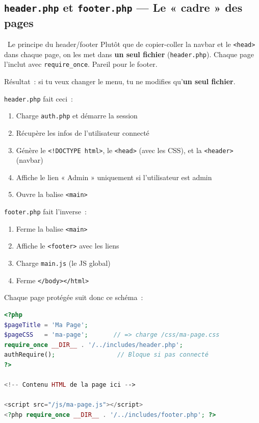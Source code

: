 \documentclass[12pt,a4paper]{article}
\begin{document}
\subsection{\texttt{header.php} et \texttt{footer.php} --- Le « cadre » des pages}

\begin{conceptbox}{\faPuzzlePiece\ Le principe du header/footer}
Plutôt que de copier-coller la navbar et le \texttt{<head>} dans chaque page, on les met dans \textbf{un seul fichier} (\texttt{header.php}). Chaque page l'inclut avec \texttt{require\_once}. Pareil pour le footer.

Résultat~: si tu veux changer le menu, tu ne modifies qu'\textbf{un seul fichier}.
\end{conceptbox}

\texttt{header.php} fait ceci~:
\begin{enumerate}
    \item Charge \texttt{auth.php} et démarre la session
    \item Récupère les infos de l'utilisateur connecté
    \item Génère le \texttt{<!DOCTYPE html>}, le \texttt{<head>} (avec les CSS), et la \texttt{<header>} (navbar)
    \item Affiche le lien « Admin » uniquement si l'utilisateur est admin
    \item Ouvre la balise \texttt{<main>}
\end{enumerate}

\texttt{footer.php} fait l'inverse~:
\begin{enumerate}
    \item Ferme la balise \texttt{<main>}
    \item Affiche le \texttt{<footer>} avec les liens
    \item Charge \texttt{main.js} (le JS global)
    \item Ferme \texttt{</body></html>}
\end{enumerate}

Chaque page protégée suit donc ce schéma~:

\begin{lstlisting}[language=PHP, title={Schéma type d'une page}]
<?php
$pageTitle = 'Ma Page';
$pageCSS   = 'ma-page';       // => charge /css/ma-page.css
require_once __DIR__ . '/../includes/header.php';
authRequire();                 // Bloque si pas connecté
?>

<!-- Contenu HTML de la page ici -->

<script src="/js/ma-page.js"></script>
<?php require_once __DIR__ . '/../includes/footer.php'; ?>
\end{lstlisting}
\end{document}
